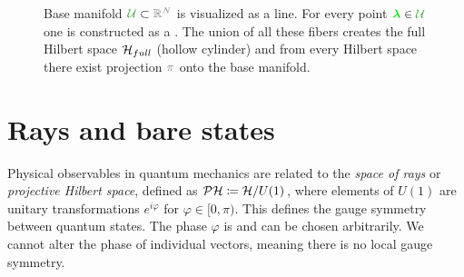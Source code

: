 \begin{figure}[H]
    \centering

\caption{Base manifold $\greenn{\mathcal U}\subset \gray{\R^N}$ is visualized as a line. For every point $\green\llambda\in\greenn{\mathcal U}$ one  is constructed as a . The union of all these fibers creates the full Hilbert space $\mathcal{H}_{full}$ (hollow cylinder) and from every Hilbert space there exist projection $\gray{\pi}$ onto the base manifold.}
    \label{fig:wholeBundle}
\end{figure}



\section{Rays and bare states}
Physical observables in quantum mechanics are related to the \emph{space of rays} or \emph{projective Hilbert space}, defined as $\mathcal{P}\mathcal{H}\coloneqq \mathcal{H}/U(1)$, where elements of $U(1)$ are unitary transformations $e^{i\varphi}$ for $\varphi\in[0,\pi)$. This defines the  gauge symmetry between quantum states. The phase $\varphi$ is  and can be chosen arbitrarily. We cannot alter the phase of individual vectors, meaning there is no local gauge symmetry. 

